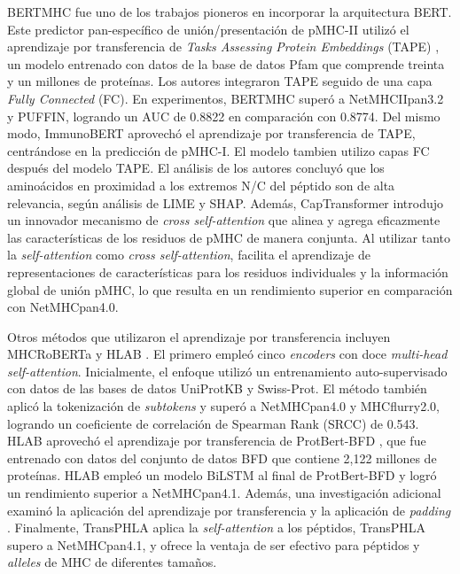 BERTMHC \citep{cheng2021bertmhc} fue uno de los trabajos pioneros en incorporar la arquitectura BERT. Este predictor pan-específico de unión/presentación de pMHC-II utilizó el aprendizaje por transferencia de \textit{Tasks Assessing Protein Embeddings} (TAPE) \citep{rao2019evaluating}, un modelo entrenado con datos de la base de datos Pfam que comprende treinta y un millones de proteínas. Los autores integraron TAPE seguido de una capa \textit{Fully Connected} (FC). En experimentos, BERTMHC superó a NetMHCIIpan3.2 y PUFFIN, logrando un AUC de 0.8822 en comparación con 0.8774. Del mismo modo, ImmunoBERT \citep{gasser2021interpreting} aprovechó el aprendizaje por transferencia de TAPE, centrándose en la predicción de pMHC-I. El modelo tambien utilizo capas FC después del modelo TAPE. El análisis de los autores concluyó que los aminoácidos en proximidad a los extremos N/C del péptido son de alta relevancia, según análisis de LIME y SHAP. Además, CapTransformer \citep{chen2021jointly} introdujo un innovador mecanismo de \textit{cross self-attention} que alinea y agrega eficazmente las características de los residuos de pMHC de manera conjunta. Al utilizar tanto la \textit{self-attention} como \textit{cross self-attention}, facilita el aprendizaje de representaciones de características para los residuos individuales y la información global de unión pMHC, lo que resulta en un rendimiento superior en comparación con NetMHCpan4.0.



Otros métodos que utilizaron el aprendizaje por transferencia incluyen MHCRoBERTa \citep{wang2022mhcroberta} y HLAB \citep{zhang2022hlab}. El primero empleó cinco \textit{encoders} con doce \textit{multi-head self-attention}. Inicialmente, el enfoque utilizó un entrenamiento auto-supervisado con datos de las bases de datos UniProtKB y Swiss-Prot. El método también aplicó la tokenización de \textit{subtokens} y superó a NetMHCpan4.0 y MHCflurry2.0, logrando un coeficiente de correlación de Spearman Rank (SRCC) de 0.543. HLAB aprovechó el aprendizaje por transferencia de ProtBert-BFD \citep{elnaggar2021prottrans}, que fue entrenado con datos del conjunto de datos BFD que contiene 2,122 millones de proteínas. HLAB empleó un modelo BiLSTM al final de ProtBert-BFD y logró un rendimiento superior a  NetMHCpan4.1. Además, una investigación adicional examinó la aplicación del aprendizaje por transferencia y la aplicación de \textit{padding} \citep{arceda2023neoantigen}. Finalmente, TransPHLA \citep{chu2022transformer}  aplica la \textit{self-attention} a los péptidos, TransPHLA  supero a  NetMHCpan4.1, y ofrece la ventaja de ser efectivo para péptidos y \textit{alleles} de MHC de diferentes tamaños.

